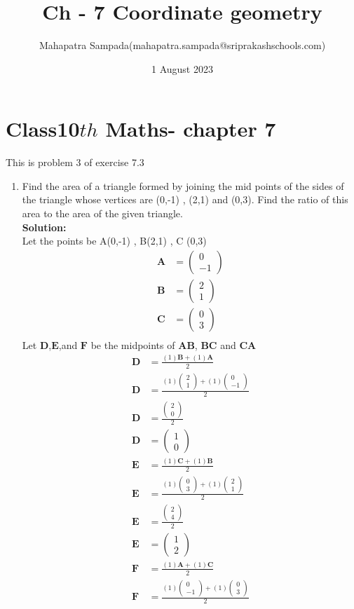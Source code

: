 \documentclass{article}
\title{Ch - 7 Coordinate geometry}
\author{Mahapatra Sampada(mahapatra.sampada@sriprakashschools.com)}
\date{1 August 2023}
\newcommand{\myvec}[1]{\ensuremath{\begin{pmatrix}#1\end{pmatrix}}}
\newcommand{\solution}{\noindent \textbf{Solution: }}
\let\vec\mathbf
\begin{document}
\maketitle
\section*{Class10${th}$ Maths- chapter 7}
This is problem 3 of exercise 7.3
\begin{enumerate}
\item Find the area of a triangle formed by joining the mid points of the sides of the triangle whose vertices are (0,-1) , (2,1) and (0,3). Find the ratio of this area to the area of the given triangle. \\

\solution\\
Let the points be A(0,-1) , B(2,1) , C (0,3)\\ 
\begin{align}
\vec{A}&=\myvec{0\\-1}\\
\vec{B}&=\myvec{2\\1}\\
\vec{C}&=\myvec{0\\3}\\
\end{align}
Let $\vec{D}$,$\vec{E}$,and $\vec{F}$ be the midpoints of $\vec{AB}$, $\vec{BC}$ and $\vec{CA}$
\begin{align}
    \vec{D} &= \frac{(1)\vec{B}+(1)\vec{A}}{2}\\
    \vec{D} &= \frac{(1)\myvec{2\\1}+(1)\myvec{0\\-1}}{2}\\
    \vec{D} &= \frac{\myvec{2\\0}}{2}\\
    \vec{D} &= \myvec{1\\0}\\
    \vec{E} &= \frac{(1)\vec{C}+(1)\vec{B}}{2}\\
    \vec{E} &= \frac{(1)\myvec{0\\3}+(1)\myvec{2\\1}}{2}\\
    \vec{E} &= \frac{\myvec{2\\4}}{2}\\
    \vec{E} &= \myvec{1\\2}\\
    \vec{F} &= \frac{(1)\vec{A}+(1)\vec{C}}{2}\\
    \vec{F} &= \frac{(1)\myvec{0\\-1}+(1)\myvec{0\\3}}{2}\\

\end{align}
\end{enumerate}
\end{document}
